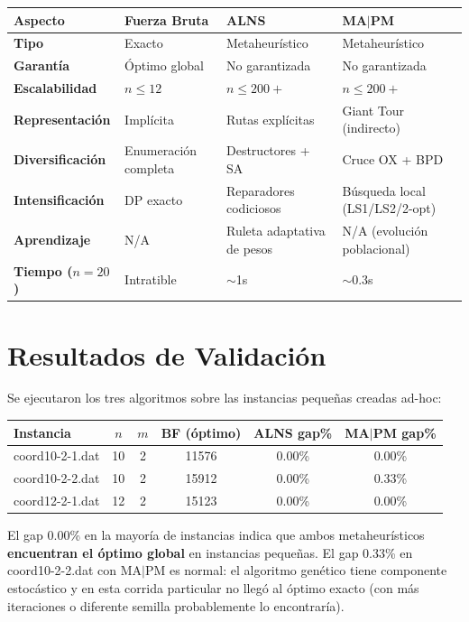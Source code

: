 \documentclass[12pt,a4paper]{article}
\begin{document}
\begin{center}
\begin{tabular}{>{\bfseries}lp{3.8cm}p{3.8cm}p{3.8cm}}
\toprule
Aspecto & Fuerza Bruta & ALNS & MA$|$PM \\
\midrule
Tipo & Exacto & Metaheurístico & Metaheurístico \\
Garantía & Óptimo global & No garantizada & No garantizada \\
Escalabilidad & $n \leq 12$ & $n \leq 200+$ & $n \leq 200+$ \\
Representación & Implícita & Rutas explícitas & Giant Tour (indirecto) \\
Diversificación & Enumeración completa & Destructores + SA & Cruce OX + BPD \\
Intensificación & DP exacto & Reparadores codiciosos & Búsqueda local (LS1/LS2/2-opt) \\
Aprendizaje & N/A & Ruleta adaptativa de pesos & N/A (evolución poblacional) \\
Tiempo ($n=20$) & Intratible & $\sim$1s & $\sim$0.3s \\
\bottomrule
\end{tabular}
\end{center}

\section{Resultados de Validación}

Se ejecutaron los tres algoritmos sobre las instancias pequeñas creadas ad-hoc:

\begin{center}
\begin{tabular}{lccccc}
\toprule
Instancia & $n$ & $m$ & BF (óptimo) & ALNS gap\% & MA$|$PM gap\% \\
\midrule
coord10-2-1.dat & 10 & 2 & 11576 & 0.00\% & 0.00\% \\
coord10-2-2.dat & 10 & 2 & 15912 & 0.00\% & 0.33\% \\
coord12-2-1.dat & 12 & 2 & 15123 & 0.00\% & 0.00\% \\
\bottomrule
\end{tabular}
\end{center}

\begin{nota}
El gap 0.00\% en la mayoría de instancias indica que ambos metaheurísticos \textbf{encuentran el óptimo global} en instancias pequeñas. El gap 0.33\% en coord10-2-2.dat con MA$|$PM es normal: el algoritmo genético tiene componente estocástico y en esta corrida particular no llegó al óptimo exacto (con más iteraciones o diferente semilla probablemente lo encontraría).
\end{nota}
\end{document}
